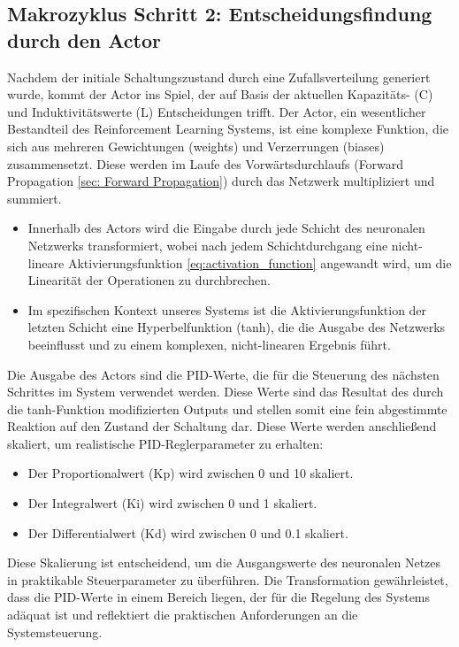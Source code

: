 \subsection{Makrozyklus Schritt 2: Entscheidungsfindung durch den Actor}

Nachdem der initiale Schaltungszustand durch eine Zufallsverteilung generiert wurde, kommt der Actor ins Spiel, der auf Basis der aktuellen Kapazitäts- (C) und Induktivitätswerte (L) Entscheidungen trifft. Der Actor, ein wesentlicher Bestandteil des Reinforcement Learning Systems, ist eine komplexe Funktion, die sich aus mehreren Gewichtungen (weights) und Verzerrungen (biases) zusammensetzt. Diese werden im Laufe des Vorwärtsdurchlaufs (Forward Propagation \ref{sec: Forward Propagation}) durch das Netzwerk multipliziert und summiert.

\begin{itemize}
		\item Innerhalb des Actors wird die Eingabe durch jede Schicht des neuronalen Netzwerks transformiert, wobei nach jedem Schichtdurchgang eine nicht-lineare Aktivierungsfunktion \ref{eq:activation_function} angewandt wird, um die Linearität der Operationen zu durchbrechen.
		\item Im spezifischen Kontext unseres Systems ist die Aktivierungsfunktion der letzten Schicht eine  Hyperbelfunktion (tanh), die die Ausgabe des Netzwerks beeinflusst und zu einem komplexen, nicht-linearen Ergebnis führt.
\end{itemize}

Die Ausgabe des Actors sind die PID-Werte, die für die Steuerung des nächsten Schrittes im System verwendet werden. Diese Werte sind das Resultat des durch die tanh-Funktion modifizierten Outputs und stellen somit eine fein abgestimmte Reaktion auf den Zustand der Schaltung dar. Diese Werte werden anschließend skaliert, um realistische PID-Reglerparameter zu erhalten:

\begin{itemize}
	\item Der Proportionalwert (Kp) wird zwischen 0 und 10 skaliert.
	\item Der Integralwert (Ki) wird zwischen 0 und 1 skaliert.
	\item Der Differentialwert (Kd) wird zwischen 0 und 0.1 skaliert.
\end{itemize}

Diese Skalierung ist entscheidend, um die Ausgangswerte des neuronalen Netzes in praktikable Steuerparameter zu überführen. Die Transformation gewährleistet, dass die PID-Werte in einem Bereich liegen, der für die Regelung des Systems adäquat ist und reflektiert die praktischen Anforderungen an die Systemsteuerung. 


